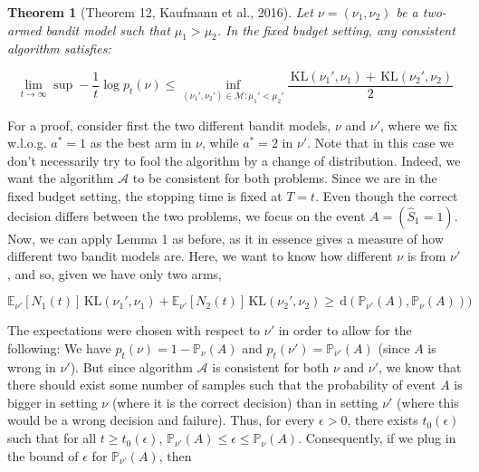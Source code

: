 \documentclass[11pt,]{article}
\newtheorem{theorem}{Theorem}
\newcommand{\KL}{\,\text{KL}}
\newcommand{\der}{\,\text{d}}
\begin{document}
\begin{theorem}[Theorem 12, Kaufmann et al., 2016] \label{theorem:KaufmannEtAlTheorem12}
Let $\nu = (\nu_1, \nu_2)$ be a two-armed bandit model such that $\mu_1 > \mu_2$. In the fixed budget setting, any consistent algorithm satisfies:

\begin{equation*}
\lim_{t \to \infty} \sup - \frac{1}{t} \log p_t(\nu) \leq \inf_{(\nu_1', \nu_2') \in \mathcal{M}: \mu_1' < \mu_2'} \frac{\KL(\nu_1', \nu_1) + \KL(\nu_2', \nu_2)}{2}
\end{equation*}
\end{theorem}

For a proof, consider first the two different bandit models, \(\nu\) and
\(\nu'\), where we fix w.l.o.g. \(a^* = 1\) as the best arm in \(\nu\),
while \(a^* = 2\) in \(\nu'\). Note that in this case we don't
necessarily try to fool the algorithm by a change of distribution.
Indeed, we want the algorithm \(\mathcal{A}\) to be consistent for both
problems. Since we are in the fixed budget setting, the stopping time is
fixed at \(T = t\). Even though the correct decision differs between the
two problems, we focus on the event \(A = (\hat{S}_1 = 1)\). Now, we can
apply Lemma 1 as before, as it in essence gives a measure of how
different two bandit models are. Here, we want to know how different
\(\nu\) is from \(\nu'\), and so, given we have only two arms,

\begin{equation*}
\mathbb{E}_{\nu'}[N_1(t)]\KL(\nu_1', \nu_1) + \mathbb{E}_{\nu'}[N_2(t)]\KL(\nu_2', \nu_2) \geq \der(\mathbb{P}_{\nu'}(A),\mathbb{P}_{\nu}(A)))
\end{equation*}

The expectations were chosen with respect to \(\nu'\) in order to allow
for the following: We have \(p_t(\nu) = 1 - \mathbb{P}_{\nu}(A)\) and
\(p_t(\nu') = \mathbb{P}_{\nu'}(A)\) (since \(A\) is wrong in \(\nu'\)).
But since algorithm \(\mathcal{A}\) is consistent for both \(\nu\) and
\(\nu'\), we know that there should exist some number of samples such
that the probability of event \(A\) is bigger in setting \(\nu\) (where
it is the correct decision) than in setting \(\nu'\) (where this would
be a wrong decision and failure). Thus, for every \(\epsilon > 0\),
there exists \(t_0(\epsilon)\) such that for all
\(t \geq t_0(\epsilon)\),
\(\mathbb{P}_{\nu'}(A) \leq \epsilon \leq \mathbb{P}_\nu(A)\).
Consequently, if we plug in the bound of \(\epsilon\) for
\(\mathbb{P}_{\nu'}(A)\), then
\end{document}
